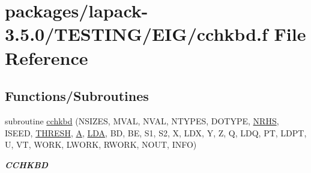 \hypertarget{cchkbd_8f}{}\section{packages/lapack-\/3.5.0/\+T\+E\+S\+T\+I\+N\+G/\+E\+I\+G/cchkbd.f File Reference}
\label{cchkbd_8f}
\subsection*{Functions/\+Subroutines}
\begin{DoxyCompactItemize}
\item 
subroutine \hyperlink{group__complex__eig_ga44246338e3797ea8686b9db821963411}{cchkbd} (N\+S\+I\+Z\+E\+S, M\+V\+A\+L, N\+V\+A\+L, N\+T\+Y\+P\+E\+S, D\+O\+T\+Y\+P\+E, \hyperlink{example__user_8c_aa0138da002ce2a90360df2f521eb3198}{N\+R\+H\+S}, I\+S\+E\+E\+D, \hyperlink{zlaqgs_8c_a0656018abfc9fa2821827415f5d5ea57}{T\+H\+R\+E\+S\+H}, \hyperlink{classA}{A}, \hyperlink{example__user_8c_ae946da542ce0db94dced19b2ecefd1aa}{L\+D\+A}, B\+D, B\+E, S1, S2, X, L\+D\+X, Y, Z, Q, L\+D\+Q, P\+T, L\+D\+P\+T, U, V\+T, W\+O\+R\+K, L\+W\+O\+R\+K, R\+W\+O\+R\+K, N\+O\+U\+T, I\+N\+F\+O)
\begin{DoxyCompactList}\small\item\em {\bfseries C\+C\+H\+K\+B\+D} \end{DoxyCompactList}\end{DoxyCompactItemize}
